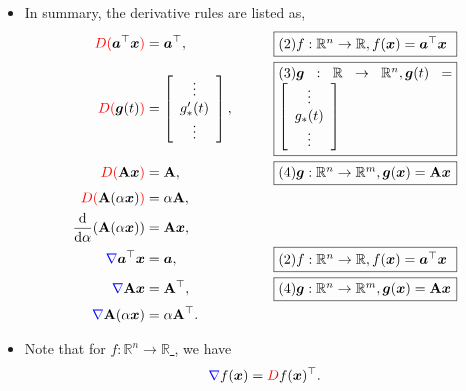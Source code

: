 \documentclass[12pt,thmsa]{article}
\begin{document}
\begin{itemize}
	\item In summary, the derivative rules are listed as,
	\begin{align*}
		{\color{red} D(} \boldsymbol{a}^{\top} \boldsymbol{x} {\color{red})} 
		&= \boldsymbol{a}^{\top}, \qquad &
			\fbox{\parbox{0.36\textwidth}{\( (2) f: \mathbb{R}^{n} \rightarrow \mathbb{R}, f(\boldsymbol{x}) =  \boldsymbol{a}^{\top} \boldsymbol{x} \)}} \\
		{\color{red} D(} \boldsymbol{g}(t) {\color{red})} 
		&= \left[ \begin{array}{c} \vdots \\ g_{*}'(t) \\ \vdots \end{array} \right], \qquad &
			\fbox{\parbox{0.36\textwidth}{\( (3) \boldsymbol{g}: \mathbb{R} \rightarrow \mathbb{R}^{n}, \boldsymbol{g}(t) =  \left[ \begin{array}{c} \vdots \\ g_{*}(t) \\ \vdots \end{array} \right] \)}} \\
		{\color{red} D(} \mathbf{A} \boldsymbol{x} {\color{red})} 
		&= {\color{black} \mathbf{A}}, \qquad &
			\fbox{\parbox{0.36\textwidth}{\( (4) \boldsymbol{g}: \mathbb{R}^{n} \rightarrow \mathbb{R}^{m}, \boldsymbol{g}(\boldsymbol{x}) =  \mathbf{A} \boldsymbol{x} \)}} \\
		{\color{red} D(} \mathbf{A}(\alpha \boldsymbol{x}) {\color{red})} 
		&= {\color{black} \alpha \mathbf{A}}, \\
			\frac{\mathrm{d}}{\mathrm{d} \alpha}( {\color{black}\mathbf{A}(\alpha \boldsymbol{x})} ) &= {\color{black} \mathbf{A} \boldsymbol{x}}, \\
		{\color{blue}\nabla} \boldsymbol{a}^{\top} \boldsymbol{x} 
		&= \boldsymbol{a},  \qquad & 
			\fbox{\parbox{0.36\textwidth}{\( (2) f: \mathbb{R}^{n} \rightarrow \mathbb{R}, f(\boldsymbol{x}) =  \boldsymbol{a}^{\top} \boldsymbol{x} \)}} \\
		{\color{blue}\nabla} \mathbf{A} \boldsymbol{x} 
		&= \mathbf{A}^{\top}, \qquad & 
			\fbox{\parbox{0.36\textwidth}{\( (4) \boldsymbol{g}: \mathbb{R}^{n} \rightarrow \mathbb{R}^{m}, \boldsymbol{g}(\boldsymbol{x}) =  \mathbf{A} \boldsymbol{x} \)}} \\
		{\color{blue}\nabla} \mathbf{A}(\alpha \boldsymbol{x}) 
		&=  \alpha \mathbf{A}^{\top}. \\
	\end{align*}
	
	\item Note that for \underline{ \(f: \mathbb{R}^n \rightarrow \mathbb{R}\) }, we have
	\[
	{\color{blue} \nabla} f(\boldsymbol{x})={\color{red} D} f(\boldsymbol{x})^{\top}.
	\]
\end{itemize}
\end{document}
